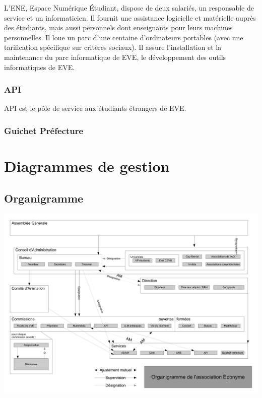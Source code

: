L'ENE, Espace Numérique Étudiant, dispose de deux salariés, un
responsable de service et un informaticien.
Il fournit une assistance logicielle et matérielle auprès des étudiants,
mais aussi personnels dont enseignants pour leurs machines personnelles.
Il loue un parc d'une centaine d'ordinateurs portables (avec une tarification
spécifique sur critères sociaux). Il assure l'installation et la maintenance
du parc informatique de EVE, le développement des outils informatiques de EVE.

\subsubsection{API}

API est le pôle de service aux étudiants étrangers de EVE.

\subsubsection{Guichet Préfecture}

\section{Diagrammes de gestion}

\subsection{Organigramme}

\newpage

\includegraphics[trim=0mm 0mm 210mm 0mm,clip,scale=0.8]{annexes/organigramme.pdf}

